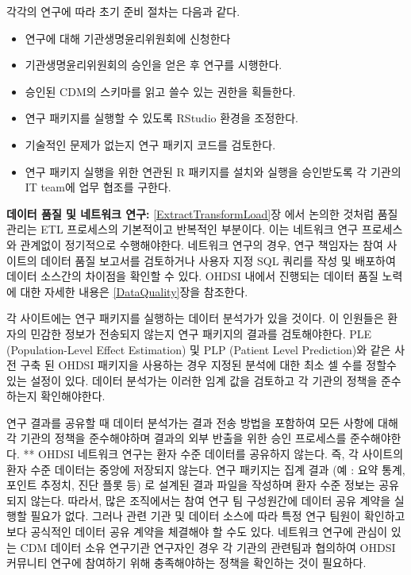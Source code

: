 \documentclass[11pt]{book}
\providecommand{\tightlist}{%
  \setlength{\itemsep}{0pt}\setlength{\parskip}{0pt}}
\theoremstyle{definition}
\theoremstyle{definition}
\theoremstyle{definition}
\theoremstyle{remark}
\let\BeginKnitrBlock\begin \let\EndKnitrBlock\end
\begin{document}
각각의 연구에 따라 초기 준비 절차는 다음과 같다.

\begin{itemize}
\tightlist
\item
  연구에 대해 기관생명윤리위원회에 신청한다
\item
  기관생명윤리위원회의 승인을 얻은 후 연구를 시행한다.
\item
  승인된 CDM의 스키마를 읽고 쓸수 있는 권한을 획들한다.
\item
  연구 패키지를 실행할 수 있도록 RStudio 환경을 조정한다.
\item
  기술적인 문제가 없는지 연구 패키지 코드를 검토한다.
\item
  연구 패키지 실행을 위한 연관된 R 패키지를 설치와 실행을 승인받도록 각
  기관의 IT team에 업무 협조를 구한다.
\end{itemize}

\BeginKnitrBlock{rmdimportant}
\textbf{데이터 품질 및 네트워크 연구:} \ref{ExtractTransformLoad}장 에서
논의한 것처럼 품질 관리는 ETL 프로세스의 기본적이고 반복적인 부분이다.
이는 네트워크 연구 프로세스와 관계없이 정기적으로 수행해야한다. 네트워크
연구의 경우, 연구 책임자는 참여 사이트의 데이터 품질 보고서를 검토하거나
사용자 지정 SQL 쿼리를 작성 및 배포하여 데이터 소스간의 차이점을 확인할
수 있다. OHDSI 내에서 진행되는 데이터 품질 노력에 대한 자세한 내용은
\ref{DataQuality}장을 참조한다.
\EndKnitrBlock{rmdimportant}

각 사이트에는 연구 패키지를 실행하는 데이터 분석가가 있을 것이다. 이
인원들은 환자의 민감한 정보가 전송되지 않는지 연구 패키지의 결과를
검토해야한다. PLE (Population-Level Effect Estimation) 및 PLP (Patient
Level Prediction)와 같은 사전 구축 된 OHDSI 패키지을 사용하는 경우
지정된 분석에 대한 최소 셀 수를 정할수 있는 설정이 있다. 데이터 분석가는
이러한 임계 값을 검토하고 각 기관의 정책을 준수하는지 확인해야한다.

연구 결과를 공유할 때 데이터 분석가는 결과 전송 방법을 포함하여 모든
사항에 대해 각 기관의 정책을 준수해야하며 결과의 외부 반출을 위한 승인
프로세스를 준수해야한다. ** OHDSI 네트워크 연구는 환자 수준 데이터를
공유하지 않는다. 즉, 각 사이트의 환자 수준 데이터는 중앙에 저장되지
않는다. 연구 패키지는 집계 결과 (예 : 요약 통계, 포인트 추정치, 진단
플롯 등) 로 설계된 결과 파일을 작성하며 환자 수준 정보는 공유되지
않는다. 따라서, 많은 조직에서는 참여 연구 팀 구성원간에 데이터 공유
계약을 실행할 필요가 없다. 그러나 관련 기관 및 데이터 소스에 따라 특정
연구 팀원이 확인하고 보다 공식적인 데이터 공유 계약을 체결해야 할 수도
있다. 네트워크 연구에 관심이 있는 CDM 데이터 소유 연구기관 연구자인 경우
각 기관의 관련팀과 협의하여 OHDSI 커뮤니티 연구에 참여하기 위해
충족해야하는 정책을 확인하는 것이 필요하다.
\end{document}
